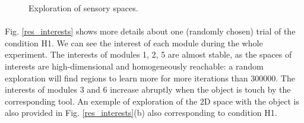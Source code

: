 \documentclass[10pt,letterpaper]{article}
\begin{document}
\begin{figure}[ht]
		\caption{Exploration of sensory spaces.}
		\label{res_explo}
	\end{figure}


	\paragraph{}
	Fig. \ref{res_interests} shows more details about one (randomly chosen) trial of the condition H1. 
	We can see the interest of each module during the whole experiment.
	The interests of modules 1, 2, 5 are almost stable, as the spaces of interests are high-dimensional and homogeneously reachable: a random exploration will find regions to learn more for more iterations than $300000$.
	The interests of modules 3 and 6 increase abruptly when the object is touch by the corresponding tool.
	An exemple of exploration of the $2$D space with the object is also provided in Fig. \ref{res_interests}(b) also corresponding to condition H1.
	
\end{document}
